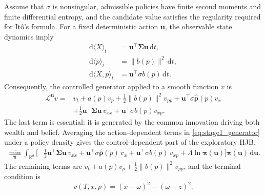 \documentclass[a4paper,10pt]{article}
\newcommand{\R}{\mathbb{R}}
\newcommand{\dd}{\mathrm{d}}
\newcommand{\bpi}{\bm{\pi}}
\newcommand{\bu}{\bm{u}}
\newcommand{\bSigma}{\bm{\Sigma}}
\newcommand{\brho}{\bm{\rho}}
\begin{document}
Assume that $\sigma$ is nonsingular, admissible policies have finite second moments and finite differential entropy, and the candidate value satisfies the regularity required for It\^{o}'s formula. For a fixed deterministic action $\bu$, the observable state dynamics imply
\begin{align}
\dd\langle X\rangle_t&=\bu^\top\bSigma\bu\,\dd t,\\
\dd\langle p\rangle_t&=\|b(p)\|^2\,\dd t,\\
\dd\langle X,p\rangle_t&=\bu^\top\sigma b(p)\,\dd t.
\end{align}
Consequently, the controlled generator applied to a smooth function $v$ is
\begin{align}
\mathcal L^{\bu}v
={}&v_t+a(p)v_p+\tfrac12\|b(p)\|^2v_{pp}
+\bu^\top\sigma\widehat{\brho}(p)v_x \\ 
&+\tfrac12\bu^\top\bSigma\bu\,v_{xx}
+\bu^\top\sigma b(p)v_{xp}.
\label{eq:stage1_generator}
\end{align}
The last term is essential: it is generated by the common innovation driving both wealth and belief. Averaging the action-dependent terms in \eqref{eq:stage1_generator} under a policy density gives the control-dependent part of the exploratory HJB,
\begin{align}
\min_{\bpi}\int_{\R^d}\Big[
&\tfrac12\bu^\top\bSigma\bu\,v_{xx}
+\bu^\top\sigma\widehat{\brho}(p)\,v_x
+\bu^\top\sigma b(p)\,v_{xp}
+\Lambda\ln\bpi(\bu)
\Big]\bpi(\bu)\,\dd\bu.
\label{eq:hjb_core}
\end{align}
The remaining terms are
\(
v_t+a(p)v_p+\tfrac12\|b(p)\|^2v_{pp}
\), and the terminal condition is
\begin{equation}
v(T,x,p)=(x-\omega)^2-(\omega-z)^2.
\end{equation}
\end{document}

